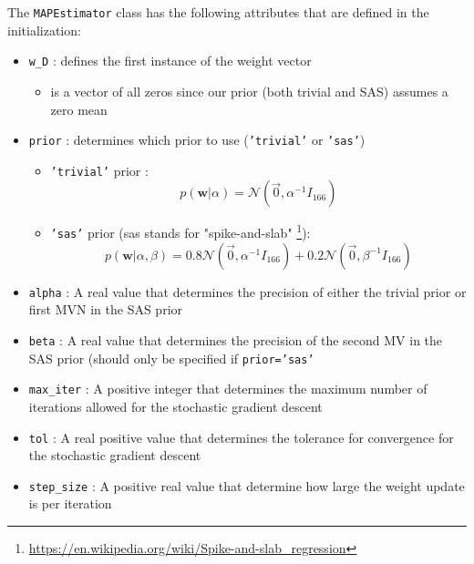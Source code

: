 \documentclass[12pt]{article}
\begin{document}
The \texttt{MAPEstimator} class has the following attributes that are defined in the initialization:

\begin{itemize}
\item \texttt{w\_D} : defines the first instance of the weight vector

	\begin{itemize}
	\item is a vector of all zeros since our prior (both trivial and SAS) assumes a zero mean
	\end{itemize}
	
\item \texttt{prior} : determines which prior to use (\texttt{'trivial'} or \texttt{'sas'})

	\begin{itemize}
	\item \texttt{'trivial'} prior :
\begin{equation}
p(\textbf{w}|\alpha) = \mathcal{N}(\vec{0}, 	\alpha^{-1}I_{166})
\end{equation}
	\item \texttt{'sas'} prior (sas stands for "spike-and-slab" \footnote{\url{https://en.wikipedia.org/wiki/Spike-and-slab_regression}}):
\begin{equation}
p(\textbf{w}|\alpha,\beta) = 0.8\mathcal{N}(\vec{0}, 	\alpha^{-1}I_{166}) + 0.2\mathcal{N}(\vec{0}, 	\beta^{-1}I_{166})
\end{equation}
	\end{itemize}

\item \texttt{alpha} : A real value that determines the precision of either the trivial prior or first MVN in the SAS prior

\item \texttt{beta} : A real value that determines the precision of the second MV in the SAS prior (should only be specified if \texttt{prior='sas'}

\item \texttt{max\_iter} : A positive integer that determines the maximum number of iterations allowed for the stochastic gradient descent

\item \texttt{tol} : A real positive value that determines the tolerance for convergence for the stochastic gradient descent

\item \texttt{step\_size} : A positive real value that determine how large the weight update is per iteration

\end{itemize}
\end{document}
